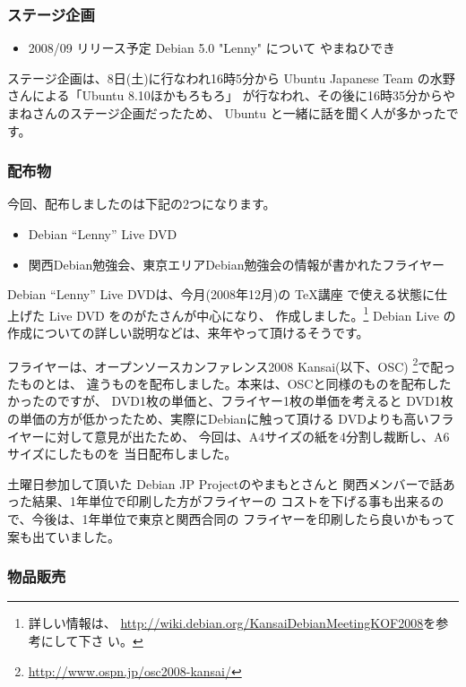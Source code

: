 \documentclass[mingoth,a4paper]{jsarticle}
\begin{document}
\subsubsection{ステージ企画}

\begin{itemize}
 \item 2008/09 リリース予定 Debian 5.0 "Lenny" について やまねひでき
\end{itemize}

ステージ企画は、8日(土)に行なわれ16時5分から Ubuntu Japanese Team
の水野さんによる「Ubuntu 8.10ほかもろもろ」
が行なわれ、その後に16時35分からやまねさんのステージ企画だったため、
Ubuntu と一緒に話を聞く人が多かったです。

\subsubsection{配布物}

今回、配布しましたのは下記の2つになります。

\begin{itemize}
 \item Debian ``Lenny'' Live DVD
 \item 関西Debian勉強会、東京エリアDebian勉強会の情報が書かれたフライヤー
\end{itemize}

Debian ``Lenny'' Live DVDは、今月(2008年12月)の \TeX 講座
で使える状態に仕上げた Live DVD をのがたさんが中心になり、
作成しました。\footnote{詳しい情報は、
\url{http://wiki.debian.org/KansaiDebianMeetingKOF2008}を参考にして下さ
い。}
Debian Live の作成についての詳しい説明などは、来年やって頂けるそうです。

フライヤーは、オープンソースカンファレンス2008 Kansai(以下、OSC)
\footnote{\url{http://www.ospn.jp/osc2008-kansai/}}で配ったものとは、
違うものを配布しました。本来は、OSCと同様のものを配布したかったのですが、
DVD1枚の単価と、フライヤー1枚の単価を考えると
DVD1枚の単価の方が低かったため、実際にDebianに触って頂ける
DVDよりも高いフライヤーに対して意見が出たため、
今回は、A4サイズの紙を4分割し裁断し、A6サイズにしたものを
当日配布しました。

土曜日参加して頂いた Debian JP Projectのやまもとさんと
関西メンバーで話あった結果、1年単位で印刷した方がフライヤーの
コストを下げる事も出来るので、今後は、1年単位で東京と関西合同の
フライヤーを印刷したら良いかもって案も出ていました。

\subsubsection{物品販売}
\end{document}
